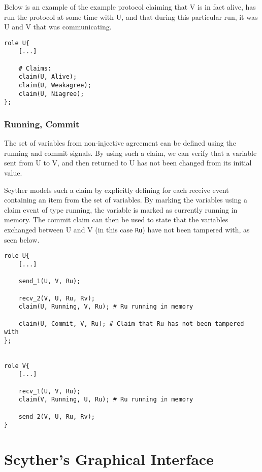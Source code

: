 
Below is an example of the example protocol claiming that V is in fact alive, has run the protocol at some time with U, and that during this particular run, it was U and V that was communicating.\newline

\begin{lstlisting}
role U{
	[...]
	
	# Claims:
	claim(U, Alive);
	claim(U, Weakagree);
	claim(U, Niagree);
};
\end{lstlisting} 





\subsubsection{Running, Commit}

The set of variables from non-injective agreement can be defined using the running and commit signals. By using such a claim, we can verify that a variable sent from U to V, and then returned to U has not been changed from its initial value.

Scyther models such a claim by explicitly defining for each receive event containing an item from the set of variables. By marking the variables using a claim event of type running, the variable is marked as currently running in memory. The commit claim can then be used to state that the variables exchanged between U and V (in this case \texttt{Ru}) have not been tampered with, as seen below.\newline

\begin{lstlisting}
role U{
	[...]
	
	send_1(U, V, Ru);
	
	recv_2(V, U, Ru, Rv);
	claim(U, Running, V, Ru); # Ru running in memory
	
	claim(U, Commit, V, Ru); # Claim that Ru has not been tampered with
};


role V{
	[...]
	
	recv_1(U, V, Ru);
	claim(V, Running, U, Ru); # Ru running in memory
	
	send_2(V, U, Ru, Rv); 
}
\end{lstlisting}

\section{Scyther's Graphical Interface}


